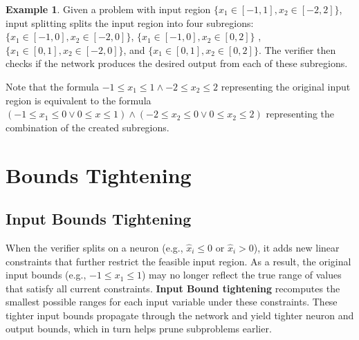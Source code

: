 \documentclass[oneside,11pt,dvipsnames]{book}
\numberwithin{equation}{section}
\theoremstyle{definition}
\newtheorem{example}{Example}[section]
\theoremstyle{remark}
\begin{document}
\begin{example}
Given a problem with input region $\{x_1 \in [-1,1] , x_2 \in [-2,2]\}$, input splitting splits the input region into four subregions:
$\{x_1 \in [-1,0] , x_2 \in [-2,0]\}$,
$\{x_1 \in [-1,0] , x_2 \in [0,2]\}$ ,
$\{x_1 \in [0,1] , x_2 \in [-2,0]\}$, and
$\{x_1 \in [0,1], x_2 \in [0,2]\}$.
The verifier then checks if the network produces the desired output from each of these subregions.

Note that the formula $-1 \le x_1 \le 1 \land -2 \le x_2 \le 2$ representing the original input region is equivalent to the formula $(-1 \le x_1 \le 0 \lor 0 \le x \le 1) \land (-2 \le x_2 \le 0 \lor 0 \le x_2 \le 2)$ representing the combination of the created subregions.
\end{example}


\section{Bounds Tightening}\label{sec:boundstigthten}

\subsection{Input Bounds Tightening}\label{sec:inputboundstigthten}

When the verifier splits on a neuron (e.g., $\hat{x}_i \le 0$ or $\hat{x}_i > 0$),
it adds new linear constraints that further restrict the feasible input region.
As a result, the original input bounds (e.g., $-1 \le x_1 \le 1$) may no longer  reflect the true range of values that satisfy all current constraints.
\textbf{Input Bound tightening} recomputes the smallest possible ranges for each input variable  under these constraints.
These tighter input bounds propagate through the network and yield tighter neuron and output bounds, which in turn helps
prune subproblems earlier.
\end{document}
